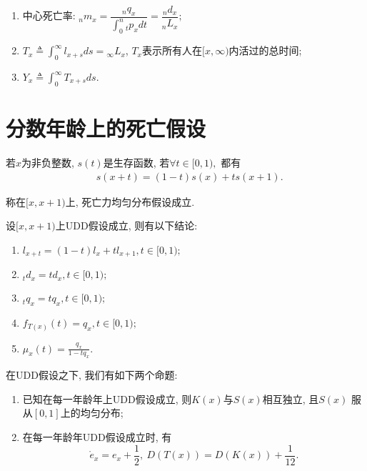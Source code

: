 \documentclass[lang=cn,10pt]{elegantbook}
\begin{document}
\begin{proposition}
	\begin{enumerate}
		\item 中心死亡率: ${}_nm_x=\dfrac {{}_nq_x}{\int_0^n{}_tp_xdt}=\dfrac{{}_nd_x}{{}_nL_x};$
		\item $T_x\triangleq\int_0^{\infty}l_{x+s}ds={}_{\infty}L_x$, $T_x$表示所有人在$[x,\infty)$内活过的总时间; 
		\item $Y_x\triangleq\int_0^{\infty}T_{x+s}ds.$
	\end{enumerate}
\end{proposition}

\section{分数年龄上的死亡假设}
\begin{definition}
	若$x$为非负整数, $s(t)$是生存函数, 若$\forall t\in [0,1),$ 都有
\begin{align}\label{tula}
     & s(x+t)=(1-t)s(x)+ts(x+1).
\end{align}

称在$[x,x+1)$上, 死亡力均匀分布假设成立.
\end{definition}

\begin{corollary}
	设$[x,x+1)$上UDD假设成立, 则有以下结论:
	\begin{enumerate}
		\item $l_{x+t}=(1-t)l_{x}+tl_{x+1},t\in [0,1);$
		\item $_{t}d_{x}=td_{x},t\in [0,1);$
		\item $_{t}q_{x}=tq_{x},t\in [0,1);$
		\item $f_{T(x)}(t)=q_{x},t\in [0,1);$
		\item $\mu_{x}(t)=\frac{q_{x}}{1-tq_x}.$
	\end{enumerate}
\end{corollary}

\begin{proposition}
	在UDD假设之下, 我们有如下两个命题:
	\begin{enumerate}
		\item 已知在每一年龄年上UDD假设成立, 则$K(x)$与$S(x)$相互独立, 且$S(x)$ 服从$[0,1]$上的均匀分布;
		\item 在每一年龄年UDD假设成立时, 有
    $$\mathring{e}_{x}=e_{x}+\frac{1}{2},\   D(T(x))=D(K(x))+\frac{1}{12}.$$
	\end{enumerate}
\end{proposition}
\end{document}
